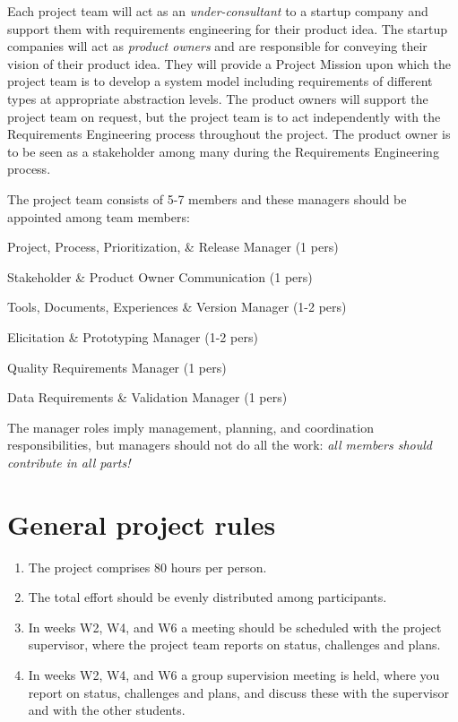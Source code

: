    \noindent Each project team will act as an \textit{under-consultant} to a startup company and support them with requirements engineering for their product idea. The startup companies will act as \textit{product owners} and are responsible for conveying their vision of their product idea. They will provide a Project Mission upon which the project team is to develop a system model including requirements of different types at appropriate abstraction levels. The product owners will support the project team on request, but the project team is to act independently with the Requirements Engineering process throughout the project. The product owner is to be seen as a stakeholder among many during the Requirements Engineering process.
   \newline

   \noindent The project team consists of 5-7 members and these managers should be appointed among team members:

   \begin{description}[noitemsep]
   \item[P3RM] Project, Process, Prioritization, \& Release Manager (1 pers)
   \item[SPOC] Stakeholder \& Product Owner Communication (1 pers)
   \item[TDEVM] Tools, Documents, Experiences \& Version Manager (1-2 pers)
   \item[EPM] Elicitation \& Prototyping Manager (1-2 pers)
   \item[QRM] Quality Requirements Manager (1 pers)
   \item[DRVM] Data Requirements \& Validation Manager (1 pers)
   \end{description}

   \noindent The manager roles imply management, planning, and coordination responsibilities, but managers should not do all the work: {\it all members should contribute in all parts!}
\fi 

\section{General project rules}
\begin{enumerate}[noitemsep]
\item The project comprises 80 hours per person.
\ifteknolog
   \item The total effort should be evenly distributed among participants.
   \item In weeks W2, W4, and W6 a meeting should be scheduled with the project supervisor, where the project team reports on status, challenges and plans.
 \else
 \item In weeks W2, W4, and W6 a group supervision meeting is held, where you report on status, challenges and plans, and discuss these with the supervisor and with the other students.
 \fi
\end{enumerate}

